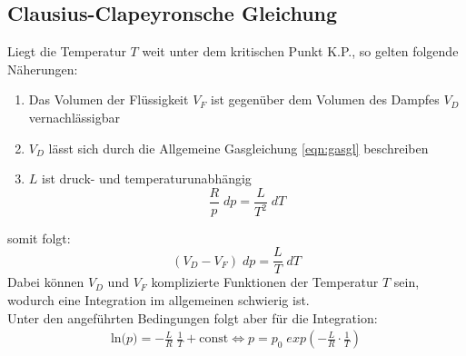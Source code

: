 \subsection{Clausius-Clapeyronsche Gleichung}
Liegt die Temperatur $T$ weit unter dem kritischen Punkt K.P., so gelten folgende Näherungen:
\begin{enumerate}
    \item Das Volumen der Flüssigkeit $V_F$ ist gegenüber dem Volumen des Dampfes $V_D$ vernachlässigbar
    \item $V_D$ lässt sich durch die Allgemeine Gasgleichung \ref{eqn:gasgl} beschreiben
    \item $L$ ist druck- und temperaturunabhängig
    \begin{equation}
        \frac{R}{p}\;dp=\frac{L}{T^2}\;dT
    \end{equation}
\end{enumerate}
somit folgt:
\begin{equation}
    (V_D-V_F)\;dp=\frac{L}{T}\;dT
    \label{eqn:L}
\end{equation}
Dabei können $V_D$ und $V_F$ komplizierte Funktionen der Temperatur $T$ sein, wodurch eine 
Integration im allgemeinen schwierig ist.\\
Unter den angeführten Bedingungen folgt aber für die Integration:
\begin{gather}
    \textrm{ln($p$)} = -\frac{L}{R}\;\frac{1}{T}+\textrm{const}
   \Longleftrightarrow p=p_0\;exp(-\frac{L}{R}\cdot \frac{1}{T})
   \label{eqn:logarithm_p}
\end{gather}